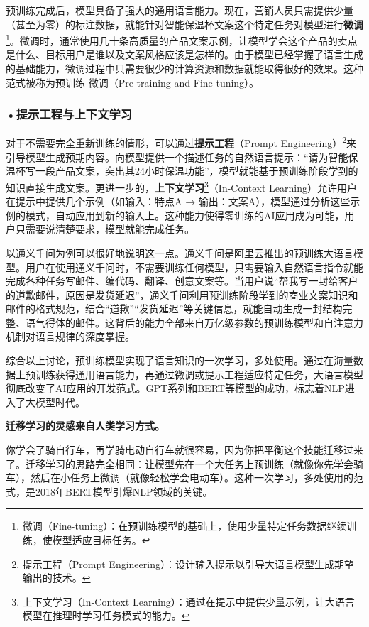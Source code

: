 预训练完成后，模型具备了强大的通用语言能力。现在，营销人员只需提供少量（甚至为零）的标注数据，就能针对智能保温杯文案这个特定任务对模型进行\textbf{微调}\footnote{微调（Fine-tuning）：在预训练模型的基础上，使用少量特定任务数据继续训练，使模型适应目标任务。}。微调时，通常使用几十条高质量的产品文案示例，让模型学会这个产品的卖点是什么、目标用户是谁以及文案风格应该是怎样的。由于模型已经掌握了语言生成的基础能力，微调过程中只需要很少的计算资源和数据就能取得很好的效果。这种范式被称为预训练-微调（Pre-training and Fine-tuning）。

\subsubsection*{\textbf{•提示工程与上下文学习}}

对于不需要完全重新训练的情形，可以通过\textbf{提示工程}（Prompt Engineering）\footnote{提示工程（Prompt Engineering）：设计输入提示以引导大语言模型生成期望输出的技术。}来引导模型生成预期内容。向模型提供一个描述任务的自然语言提示：“请为智能保温杯写一段产品文案，突出其24小时保温功能”，模型就能基于预训练阶段学到的知识直接生成文案。更进一步的，\textbf{上下文学习}\footnote{上下文学习（In-Context Learning）：通过在提示中提供少量示例，让大语言模型在推理时学习任务模式的能力。}（In-Context Learning）允许用户在提示中提供几个示例（如输入：特点A → 输出：文案A），模型通过分析这些示例的模式，自动应用到新的输入上。这种能力使得零训练的AI应用成为可能，用户只需要说清楚要求，模型就能完成任务。

以通义千问为例可以很好地说明这一点。通义千问是阿里云推出的预训练大语言模型。用户在使用通义千问时，不需要训练任何模型，只需要输入自然语言指令就能完成各种任务写邮件、编代码、翻译、创意文案等。当用户说“帮我写一封给客户的道歉邮件，原因是发货延迟”，通义千问利用预训练阶段学到的商业文案知识和邮件的格式规范，结合“道歉”“发货延迟”等关键信息，就能自动生成一封结构完整、语气得体的邮件。这背后的能力全部来自万亿级参数的预训练模型和自注意力机制对语言规律的深度掌握。

综合以上讨论，预训练模型实现了语言知识的一次学习，多处使用。通过在海量数据上预训练获得通用语言能力，再通过微调或提示工程适应特定任务，大语言模型彻底改变了AI应用的开发范式。GPT系列和BERT等模型的成功，标志着NLP进入了大模型时代。

\begin{knowledgebox}
\small
\textbf{迁移学习的灵感来自人类学习方式。}

你学会了骑自行车，再学骑电动自行车就很容易，因为你把平衡这个技能迁移过来了。迁移学习的思路完全相同：让模型先在一个大任务上预训练（就像你先学会骑车），然后在小任务上微调（就像轻松学会电动车）。这种一次学习，多处使用的范式，是2018年BERT模型引爆NLP领域的关键。
\end{knowledgebox}







